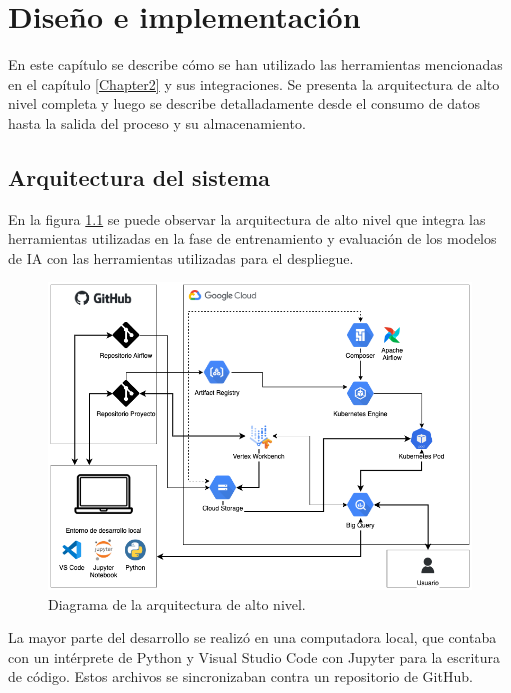 \chapter{Diseño e implementación} %

\label{Chapter3} %


En este capítulo se describe cómo se han utilizado las herramientas mencionadas en el capítulo \ref{Chapter2} y sus integraciones. Se presenta la arquitectura de alto nivel completa y luego se describe detalladamente desde el consumo de datos hasta la salida del proceso y su almacenamiento.


\section{Arquitectura del sistema}

En la figura \ref{fig:arqsistema} se puede observar la arquitectura de alto nivel que integra las herramientas utilizadas en la fase de entrenamiento y evaluación de los modelos de IA con las herramientas utilizadas para el despliegue.

\begin{figure}[htbp]
	\centering
	\includegraphics[width=1\textwidth]{./Figures/arq-sistema.png}
	\caption{Diagrama de la arquitectura de alto nivel.}
	\label{fig:arqsistema}
\end{figure}

La mayor parte del desarrollo se realizó en una computadora local, que contaba con un intérprete de Python y Visual Studio Code con Jupyter para la escritura de código. Estos archivos se sincronizaban contra un repositorio de GitHub.

